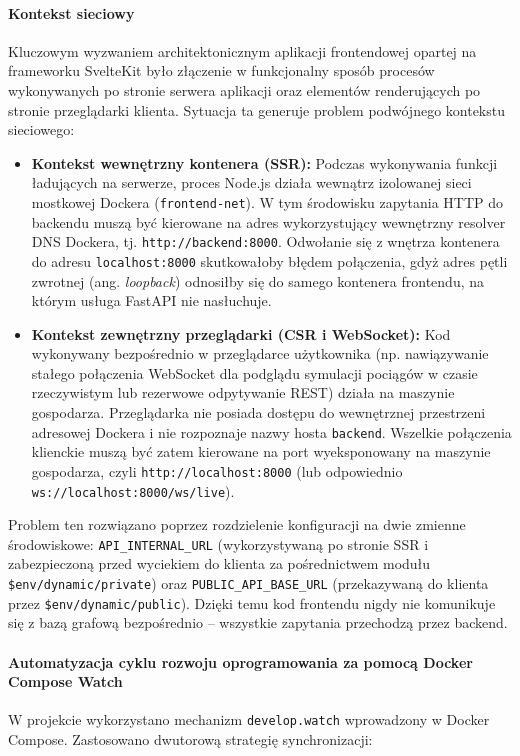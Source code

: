 \documentclass[twoside]{projektInzynierskiMS1z}
\begin{document}
\paragraph{Kontekst sieciowy}
Kluczowym wyzwaniem architektonicznym aplikacji frontendowej opartej na frameworku SvelteKit było złączenie w funkcjonalny sposób procesów wykonywanych po stronie serwera aplikacji oraz elementów renderujących po stronie przeglądarki klienta. Sytuacja ta generuje problem podwójnego kontekstu sieciowego:

\begin{itemize}                                                                                            \item \textbf{Kontekst wewnętrzny kontenera (SSR):} Podczas wykonywania funkcji ładujących na serwerze, proces Node.js działa wewnątrz izolowanej sieci mostkowej Dockera (\texttt{frontend-net}). W tym środowisku zapytania HTTP do backendu muszą być kierowane na adres wykorzystujący wewnętrzny resolver DNS Dockera, tj. \texttt{http://backend:8000}. Odwołanie się z wnętrza kontenera do adresu \texttt{localhost:8000} skutkowałoby błędem połączenia, gdyż adres pętli zwrotnej (ang. \emph{loopback}) odnosiłby się do samego kontenera frontendu, na którym usługa FastAPI nie nasłuchuje.\item \textbf{Kontekst zewnętrzny przeglądarki (CSR i WebSocket):} Kod wykonywany bezpośrednio w przeglądarce użytkownika (np. nawiązywanie stałego połączenia WebSocket dla podglądu symulacji pociągów w czasie rzeczywistym lub rezerwowe odpytywanie REST) działa na maszynie gospodarza. Przeglądarka nie posiada dostępu do wewnętrznej przestrzeni adresowej Dockera i nie rozpoznaje nazwy hosta \texttt{backend}. Wszelkie połączenia klienckie muszą być zatem kierowane na port wyeksponowany na maszynie gospodarza, czyli \texttt{http://localhost:8000} (lub odpowiednio \texttt{ws://localhost:8000/ws/live}). 
\end{itemize} Problem ten rozwiązano poprzez rozdzielenie konfiguracji na dwie zmienne środowiskowe: \texttt{API\_INTERNAL\_URL} (wykorzystywaną po stronie SSR i zabezpieczoną przed wyciekiem do klienta za pośrednictwem modułu \texttt{\$env/dynamic/private}) oraz \texttt{PUBLIC\_API\_BASE\_URL} (przekazywaną do klienta przez \texttt{\$env/dynamic/public}). Dzięki temu kod frontendu nigdy nie komunikuje się z bazą grafową bezpośrednio -- wszystkie zapytania przechodzą przez backend.  

\paragraph{Automatyzacja cyklu rozwoju oprogramowania za pomocą Docker Compose Watch} W projekcie wykorzystano mechanizm \texttt{develop.watch} wprowadzony w Docker Compose. Zastosowano dwutorową strategię synchronizacji:  
\end{document}
